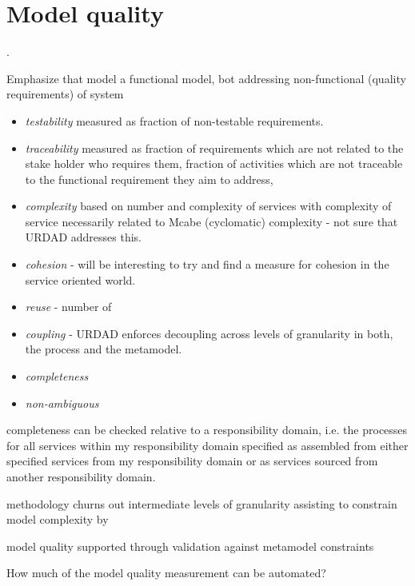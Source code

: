 \section{Model quality}




\cite{lange_managing_2005,lange_improving_2006}.


Emphasize that model a functional model, bot addressing non-functional (quality requirements) of system

\begin{itemize}
  \item \emph{testability} measured as fraction of non-testable requirements.
  \item \emph{traceability} measured as fraction of requirements which are not related to the stake holder who requires them, fraction of activities which are not traceable to the functional requirement they aim to address, 
  \item \emph{complexity} based on number and complexity of services with complexity of service necessarily related to Mcabe (cyclomatic) complexity - not sure that URDAD addresses this.
  \item \emph{cohesion} - will be interesting to try and find a measure for cohesion in the service oriented world.
  \item \emph{reuse} - number of
  \item \emph{coupling} - URDAD enforces decoupling across levels of granularity in both, the process and the metamodel.
  \item \emph{completeness}
  \item \emph{non-ambiguous}
\end{itemize}


completeness can be checked relative to a responsibility domain, i.e. the processes for all services within my responsibility domain specified as assembled from either specified services from my responsibility domain or as services sourced from another responsibility domain.

methodology churns out intermediate levels of granularity assisting to constrain model complexity by 


model quality supported through validation against metamodel constraints

How much of the model quality measurement can be automated?

